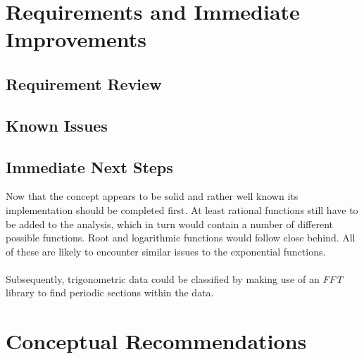 \documentclass[main.tex]{subfiles}
\begin{document}
  
  \section{Requirements and Immediate Improvements}
    
    \subsection{Requirement Review}
      
    \subsection{Known Issues}
      
    \subsection{Immediate Next Steps}
      
      Now that the concept appears to be solid and rather well known its implementation should be completed first. At least rational functions still have to be added to the analysis, which in turn would contain a number of different possible functions. Root and logarithmic functions would follow close behind. All of these are likely to encounter similar issues to the exponential functions.
      \\\\
      Subsequently, trigonometric data could be classified by making use of an \textit{FFT} library to find periodic sections within the data. 
        
  \section{Conceptual Recommendations}
    
\end{document}
